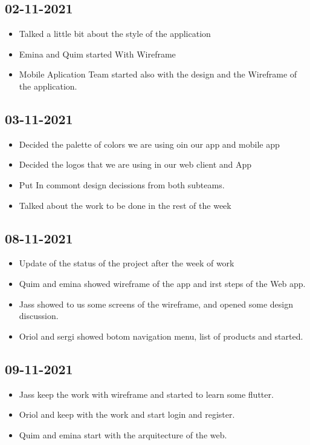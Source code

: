 \documentclass[./main.tex]{subfiles}
\begin{document}
\subsection{02-11-2021}
\begin{itemize}
\item Talked a little bit about the style of the application
\item Emina and Quim started With Wireframe
\item Mobile Aplication Team started also with the design and the Wireframe of the application.
\end{itemize}

\subsection{03-11-2021}
\begin{itemize}
\item Decided the palette of colors we are using oin our app and mobile app
\item Decided the logos that we are using in our web client and App
\item Put In commont design decissions from both subteams.
\item Talked about the work to be done in the rest of the week
\end{itemize}


\subsection{08-11-2021}
\begin{itemize}
\item Update of the status of the project after the week of work
\item Quim and emina showed wireframe of the app and irst steps of the Web app.
\item Jass showed to us some screens of the wireframe, and opened some design discussion.
\item Oriol and sergi showed botom navigation menu, list of products and started.
\end{itemize}


\subsection{09-11-2021}
\begin{itemize}
\item Jass keep the work with wireframe and started to learn some flutter.
\item Oriol and keep with the work and start login and register.
\item Quim and emina start with the arquitecture of the web.
\end{itemize}
\end{document}
